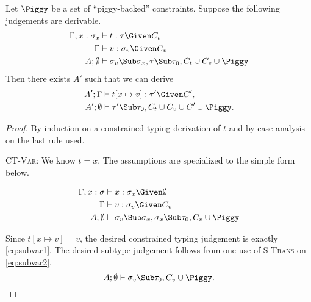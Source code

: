 \documentclass{amsart}
\theoremstyle{definition}
\begin{document}
Let $\Piggy$ be a set of ``piggy-backed'' constraints. Suppose
the following judgements are derivable.
\begin{align}
\Gamma,x:\sigma_x&\vdash t:\tau\Given C_t \notag
\\
\Gamma&\vdash v:\sigma_v \Given C_v \notag
\\
A;\emptyset&\vdash
\sigma_v\Sub\sigma_x, \tau\Sub\tau_0,C_t\cup C_v\cup\Piggy
\label{eq:subass}
\end{align}
Then there exists $A'$ such that we can derive
\begin{align*}
A';\Gamma&\vdash t[x\mapsto v] : \tau'\Given C',\\
A';\emptyset &\vdash \tau'\Sub\tau_0, C_t\cup C_v\cup C'\cup\Piggy.
\end{align*}

\begin{proof}
By induction on a constrained typing derivation of $t$ and by
case analysis on the last rule used.

\Case\textsc{CT-Var}: We know $t=x$. The assumptions are
specialized to the simple form below.
\begin{samepage}
\begin{align}
\Gamma,x:\sigma&\vdash x:\sigma_x\Given\emptyset
\notag
\\
\Gamma&\vdash v:\sigma_v\Given C_v
\label{eq:subvar1}
\\
A;\emptyset&\vdash \sigma_v\Sub\sigma_x,\sigma_x\Sub\tau_0,C_v\cup\Piggy
\label{eq:subvar2}
\end{align}
\end{samepage}%
Since $t[x\mapsto v]=v$, the desired constrained typing judgement
is exactly \eqref{eq:subvar1}. The desired subtype judgement
follows from one use of \textsc{S-Trans} on \eqref{eq:subvar2}.
\[
A;\emptyset\vdash \sigma_v\Sub\tau_0,C_v\cup\Piggy.
\]


\end{proof}
\end{document}
